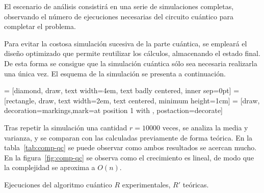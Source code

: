 El escenario de análisis consistirá en una serie de simulaciones completas, 
observando el número de ejecuciones necesarias del circuito cuántico para 
completar el problema.

Para evitar la costosa simulación sucesiva de la parte cuántica, se empleará el 
diseño optimizado que permite reutilizar los cálculos, almacenando el estado 
final. De esta forma se consigue que la simulación cuántica sólo sea necesaria 
realizarla una única vez. El esquema de la simulación se presenta a 
continuación.

\begin{center}
 = [diamond, draw, text width=4em, text badly centered, 
inner sep=0pt]
 = [rectangle, draw, text width=2em, text centered, minimum 
height=1cm]
 = [draw, decoration={markings,mark=at position 
1 with {}}, postaction={decorate}]
%
\end{center}

Tras repetir la simulación una cantidad $r = 10000$ veces, se analiza la media y 
varianza, y se comparan con las calculadas previamente de forma teórica. En la 
tabla~\ref{tab:comp-qc} se puede observar como ambos resultados se acercan 
mucho. En la figura~\ref{fig:comp-qc} se observa como el crecimiento es lineal, 
de modo que la complejidad se aproxima a $O(n)$.


\begin{table}[!htb]
\centering
{}
\caption{Ejecuciones del algoritmo cuántico $R$ experimentales, $R'$ teóricas.}
\label{tab:comp-qc}
\end{table}

